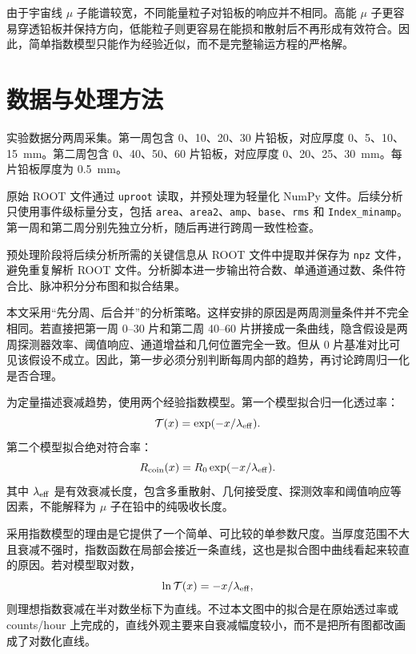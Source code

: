 \documentclass[aps,prl,twocolumn,superscriptaddress,nofootinbib]{revtex4-2}
\begin{document}
由于宇宙线 $\mu$ 子能谱较宽，不同能量粒子对铅板的响应并不相同。高能 $\mu$ 子更容易穿透铅板并保持方向，低能粒子则更容易在能损和散射后不再形成有效符合。因此，简单指数模型只能作为经验近似，而不是完整输运方程的严格解。

\section{数据与处理方法}

实验数据分两周采集。第一周包含 0、10、20、30 片铅板，对应厚度 0、5、10、\SI{15}{mm}。第二周包含 0、40、50、60 片铅板，对应厚度 0、20、25、\SI{30}{mm}。每片铅板厚度为 \SI{0.5}{mm}。

原始 ROOT 文件通过 \texttt{uproot} 读取，并预处理为轻量化 NumPy 文件。后续分析只使用事件级标量分支，包括 \texttt{area}、\texttt{area2}、\texttt{amp}、\texttt{base}、\texttt{rms} 和 \texttt{Index\_minamp}。第一周和第二周分别先独立分析，随后再进行跨周一致性检查。

预处理阶段将后续分析所需的关键信息从 ROOT 文件中提取并保存为 \texttt{npz} 文件，避免重复解析 ROOT 文件。分析脚本进一步输出符合数、单通道通过数、条件符合比、脉冲积分分布图和拟合结果。

本文采用“先分周、后合并”的分析策略。这样安排的原因是两周测量条件并不完全相同。若直接把第一周 0--30 片和第二周 40--60 片拼接成一条曲线，隐含假设是两周探测器效率、阈值响应、通道增益和几何位置完全一致。但从 0 片基准对比可见该假设不成立。因此，第一步必须分别判断每周内部的趋势，再讨论跨周归一化是否合理。

为定量描述衰减趋势，使用两个经验指数模型。第一个模型拟合归一化透过率：
\begin{equation}
\mathcal{T}(x)=\exp(-x/\lambda_{\rm eff}).
\end{equation}
第二个模型拟合绝对符合率：
\begin{equation}
R_{\rm coin}(x)=R_0\exp(-x/\lambda_{\rm eff}).
\end{equation}
其中 $\lambda_{\rm eff}$ 是有效衰减长度，包含多重散射、几何接受度、探测效率和阈值响应等因素，不能解释为 $\mu$ 子在铅中的纯吸收长度。

采用指数模型的理由是它提供了一个简单、可比较的单参数尺度。当厚度范围不大且衰减不强时，指数函数在局部会接近一条直线，这也是拟合图中曲线看起来较直的原因。若对模型取对数，
\begin{equation}
\ln \mathcal{T}(x)=-x/\lambda_{\rm eff},
\end{equation}
则理想指数衰减在半对数坐标下为直线。不过本文图中的拟合是在原始透过率或 counts/hour 上完成的，直线外观主要来自衰减幅度较小，而不是把所有图都改画成了对数化直线。
\end{document}
